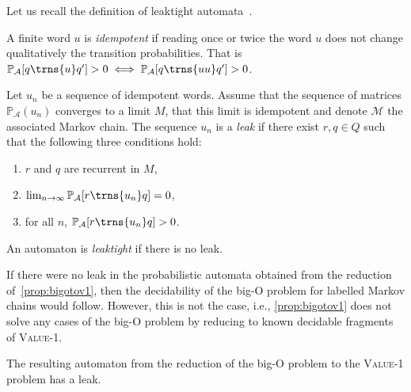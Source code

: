 \documentclass{lmcs}
\theoremstyle{plain}
\theoremstyle{definition}
\theoremstyle{remark}
\newcommand\pr{\mathbb{P}}
\newcommand\pa{\mathcal{A}}
\begin{document}
Let us recall the definition of leaktight automata~\cite{oualhadj2015deciding}.

\begin{defi}
A finite word $u$ is \emph{idempotent} if reading once or twice the word $u$ does not change qualitatively the transition probabilities. That is $\pr_\pa[q \trns{u} q'] > 0 \iff \pr_\pa[q \trns{uu} q'] > 0 $.

Let $u_n$ be a sequence of idempotent words.  Assume that the sequence of matrices $\pr_\pa(u_n)$ converges to a limit $M$, that this limit is idempotent and denote $\mathcal M$ the associated Markov chain. The sequence $u_n$ is a \textit{leak} if there exist $r, q\in Q$ such that the following three conditions hold:
\begin{enumerate}
\item $r$ and $q$ are recurrent in $M$, \item $\lim_{n \to \infty} \pr_\pa[r \trns{u_n} q] = 0$, \item for all $n$, $\pr_\pa[r \trns{u_n} q]>0$.
\end{enumerate}
An automaton is \emph{leaktight} if there is no leak.
\end{defi}

If there were no leak in the probabilistic automata obtained from the reduction
of~\cref{prop:bigotov1}, then the decidability  of the big-O problem for labelled Markov
chains would follow. However, this is not the case, i.e., \cref{prop:bigotov1} does not solve any cases of the big-O problem by reducing to known decidable fragments of \textsc{Value-1}.

\begin{prop}
\label{ex:leak}
The resulting automaton from the reduction of the big-O problem to the \textsc{Value-1} problem has a leak.
\end{prop}
\end{document}
